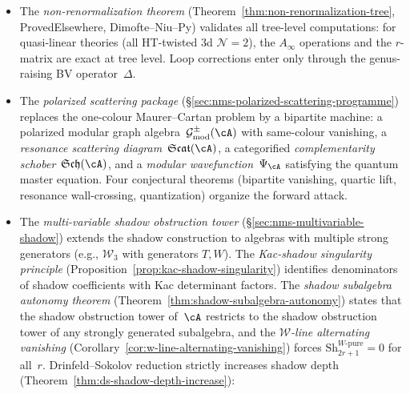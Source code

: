 \begin{itemize}
 convolution algebra~$\mathfrak{g}_\cA^{\mathrm{mod}}$ as a modular
 $L_\infty$ algebra (with the dg~Lie algebra as its strict model), and the shadow obstruction tower
 $\kappa \to \Delta \to \mathfrak{C} \to \mathfrak{Q} \to \Theta$
 arising as evaluation of the universal MC element~$\Theta_\cA$
 on specific moduli cycles. The five-component differential
 $D = d_{A_\infty} + d_{\mathrm{sew}} + \hbar\Delta + d_r$
 is automatic from the single MC equation. The dg~Lie model
 is the strict shadow of the $L_\infty$ structure; bar-cobar
 preserves quasi-isos because it is a quantum $L_\infty$ functor.
\item The \emph{non-renormalization theorem}
 (Theorem~\ref{thm:non-renormalization-tree}, ProvedElsewhere,
 Dimofte--Niu--Py) validates all tree-level computations: for
 quasi-linear theories (all HT-twisted 3d $\mathcal{N}=2$), the
 $A_\infty$ operations and the $r$-matrix are exact at tree level.
 Loop corrections enter only through the genus-raising BV
 operator~$\Delta$.
\item The \emph{polarized scattering package}
 (\S\ref{sec:nms-polarized-scattering-programme}) replaces the
 one-colour Maurer--Cartan problem by a bipartite machine:
 a polarized modular graph
 algebra~$\mathcal{G}^{\pm}_{\mathrm{mod}}(\cA)$ with
 same-colour vanishing, a \emph{resonance scattering
 diagram}~$\mathfrak{Scat}(\cA)$, a categorified
 \emph{complementarity schober}~$\mathfrak{Sch}(\cA)$, and a
 \emph{modular wavefunction}~$\Psi_\cA$ satisfying the quantum
 master equation. Four conjectural theorems (bipartite
 vanishing, quartic lift, resonance wall-crossing, quantization)
 organize the forward attack.
\item The \emph{multi-variable shadow obstruction tower}
 (\S\ref{sec:nms-multivariable-shadow}) extends the shadow
 construction to algebras with multiple strong generators
 (e.g., $\mathcal{W}_3$ with generators $T,W$). The
 \emph{Kac-shadow singularity principle}
 (Proposition~\ref{prop:kac-shadow-singularity}) identifies
 denominators of shadow coefficients with Kac determinant
 factors. The \emph{shadow subalgebra autonomy theorem}
 (Theorem~\ref{thm:shadow-subalgebra-autonomy}) states that
 the shadow obstruction tower of~$\cA$ restricts to the shadow obstruction tower of
 any strongly generated subalgebra, and the
 \emph{$\mathcal{W}$-line alternating vanishing}
 (Corollary~\ref{cor:w-line-alternating-vanishing}) forces
 $\mathrm{Sh}_{2r+1}^{W\text{-pure}} = 0$ for all~$r$.
 Drinfeld--Sokolov reduction strictly increases shadow depth
 (Theorem~\ref{thm:ds-shadow-depth-increase}):

\end{itemize}
